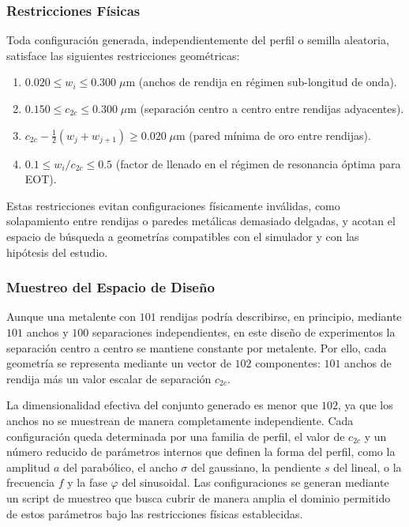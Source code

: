 \subsubsection{Restricciones Físicas}

Toda configuración generada, independientemente del perfil o semilla aleatoria, satisface las siguientes restricciones geométricas:

\begin{enumerate}
    \item $0.020 \leq w_i \leq 0.300\;\mu$m \quad (anchos de rendija en régimen sub-longitud de onda).
    \item $0.150 \leq c_{2c} \leq 0.300\;\mu$m \quad (separación centro a centro entre rendijas adyacentes).
    \item $c_{2c} - \tfrac{1}{2}(w_j + w_{j+1}) \geq 0.020\;\mu$m \quad (pared mínima de oro entre rendijas).
    \item $0.1 \leq w_i/c_{2c} \leq 0.5$ \quad (factor de llenado en el régimen de resonancia óptima para EOT).
\end{enumerate}

Estas restricciones evitan configuraciones físicamente inválidas, como solapamiento entre rendijas o paredes metálicas demasiado delgadas, y acotan el espacio de búsqueda a geometrías compatibles con el simulador y con las hipótesis del estudio.

\subsubsection{Muestreo del Espacio de Diseño}

Aunque una metalente con $101$ rendijas podría describirse, en principio, mediante $101$ anchos y $100$ separaciones independientes, en este diseño de experimentos la separación centro a centro se mantiene constante por metalente. Por ello, cada geometría se representa mediante un vector de $102$ componentes: $101$ anchos de rendija más un valor escalar de separación $c_{2c}$.

La dimensionalidad efectiva del conjunto generado es menor que $102$, ya que los anchos no se muestrean de manera completamente independiente. Cada configuración queda determinada por una familia de perfil, el valor de $c_{2c}$ y un número reducido de parámetros internos que definen la forma del perfil, como la amplitud $a$ del parabólico, el ancho $\sigma$ del gaussiano, la pendiente $s$ del lineal, o la frecuencia $f$ y la fase $\varphi$ del sinusoidal. Las configuraciones se generan mediante un script de muestreo que busca cubrir de manera amplia el dominio permitido de estos parámetros bajo las restricciones físicas establecidas.

